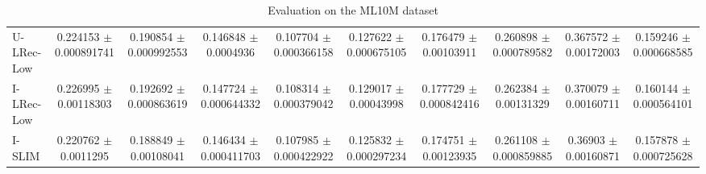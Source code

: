 \begin{table*}
{\begin{tabular}{l|cccc|cccc|c}
		U-LRec-Low&\num{0.224153} $\pm$ \num{0.000891741}&\num{0.190854} $\pm$ \num{0.000992553}&\num{0.146848} $\pm$ \num{0.0004936}&\num{0.107704} $\pm$ \num{0.000366158}&\num{0.127622} $\pm$ \num{0.000675105}&\num{0.176479} $\pm$ \num{0.00103911}&\num{0.260898} $\pm$ \num{0.000789582}&\num{0.367572} $\pm$ \num{0.00172003}&\num{0.159246} $\pm$ \num{0.000668585}\\

		I-LRec-Low & \num{0.226995} $\pm$ \num{0.00118303}&\num{0.192692} $\pm$ \num{0.000863619}&\num{0.147724} $\pm$ \num{0.000644332}&\num{0.108314} $\pm$ \num{0.000379042}&\num{0.129017} $\pm$ \num{0.00043998}&\num{0.177729} $\pm$ \num{0.000842416}&\num{0.262384} $\pm$ \num{0.00131329}&\num{0.370079} $\pm$ \num{0.00160711}&\num{0.160144} $\pm$ \num{0.000564101}\\


		I-SLIM & \num{0.220762} $\pm$ \num{0.0011295}&\num{0.188849} $\pm$ \num{0.00108041}&\num{0.146434} $\pm$ \num{0.000411703}&\num{0.107985} $\pm$ \num{0.000422922}&\num{0.125832} $\pm$ \num{0.000297234}&\num{0.174751} $\pm$ \num{0.00123935}&\num{0.261108} $\pm$ \num{0.000859885}&\num{0.36903} $\pm$ \num{0.00160871}&\num{0.157878} $\pm$ \num{0.000725628}

	\end{tabular}
}
	\caption{Evaluation on the ML10M dataset}
\end{table*}


